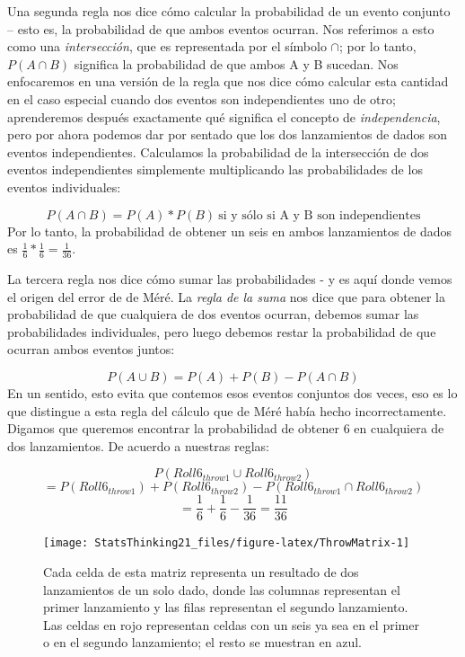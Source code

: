 \documentclass[
  12pt,
]{book}
\begin{document}
Una segunda regla nos dice cómo calcular la probabilidad de un evento conjunto -- esto es, la probabilidad de que ambos eventos ocurran. Nos referimos a esto como una \emph{intersección}, que es representada por el símbolo \(\cap\); por lo tanto, \(P(A \cap B)\) significa la probabilidad de que ambos A y B sucedan. Nos enfocaremos en una versión de la regla que nos dice cómo calcular esta cantidad en el caso especial cuando dos eventos son independientes uno de otro; aprenderemos después exactamente qué significa el concepto de \emph{independencia}, pero por ahora podemos dar por sentado que los dos lanzamientos de dados son eventos independientes. Calculamos la probabilidad de la intersección de dos eventos independientes simplemente multiplicando las probabilidades de los eventos individuales:

\[
P(A \cap B) = P(A) * P(B)\ \text{si y sólo si A y B son independientes}
\]
Por lo tanto, la probabilidad de obtener un seis en ambos lanzamientos de dados es \(\frac{1}{6}*\frac{1}{6}=\frac{1}{36}\).

La tercera regla nos dice cómo sumar las probabilidades - y es aquí donde vemos el origen del error de de Méré. La \emph{regla de la suma} nos dice que para obtener la probabilidad de que cualquiera de dos eventos ocurran, debemos sumar las probabilidades individuales, pero luego debemos restar la probabilidad de que ocurran ambos eventos juntos:

\[
P(A \cup B) = P(A) + P(B) - P(A \cap B)
\]
En un sentido, esto evita que contemos esos eventos conjuntos dos veces, eso es lo que distingue a esta regla del cálculo que de Méré había hecho incorrectamente. Digamos que queremos encontrar la probabilidad de obtener 6 en cualquiera de dos lanzamientos. De acuerdo a nuestras reglas:

\[
P(Roll6_{throw1} \cup Roll6_{throw2}) 
\]
\[
= P(Roll6_{throw1}) + P(Roll6_{throw2}) - P(Roll6_{throw1} \cap Roll6_{throw2}) 
\]
\[
= \frac{1}{6} + \frac{1}{6} - \frac{1}{36} = \frac{11}{36}
\]

\begin{figure}
\texttt{[image: StatsThinking21\_files/figure-latex/ThrowMatrix-1]} \caption{Cada celda de esta matriz representa un resultado de dos lanzamientos de un solo dado, donde las columnas representan el primer lanzamiento y las filas representan el segundo lanzamiento. Las celdas en rojo representan celdas con un seis ya sea en el primer o en el segundo lanzamiento; el resto se muestran en azul. }\label{fig:ThrowMatrix}
\end{figure}
\end{document}
